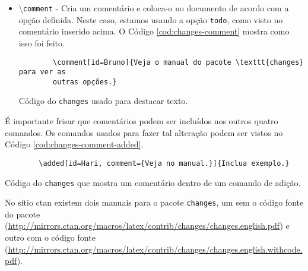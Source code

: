 \begin{itemize}
	\begin{listing}[ht]
		\begin{verbatim}
			\highlight[id=Bruno]{como este aqui.}
		\end{verbatim}
		\caption{Código do \texttt{changes} usado para destacar texto.}
		\label{cod:changes-highlighted}
	\end{listing}

	\item \textbackslash \texttt{comment} - Cria um comentário e coloca-o no documento de acordo com a opção definida. Neste caso, estamos usando a opção \texttt{todo}, como visto no comentário inserido acima. O Código \ref{cod:changes-comment} mostra como isso foi feito.
	
	\begin{listing}[H]
		\begin{verbatim}
		\comment[id=Bruno]{Veja o manual do pacote \texttt{changes} para ver as 
		outras opções.}
		\end{verbatim}
		\caption{Código do \texttt{changes} usado para destacar texto.}
		\label{cod:changes-comment}
	\end{listing}

\end{itemize}

É importante frisar que comentários podem ser incluídos nos outros quatro comandos.  Os comandos usados para fazer tal alteração podem ser vistos no Código \ref{cod:changes-comment-added}.

\begin{listing}[ht]
	\begin{verbatim}
		\added[id=Hari, comment={Veja no manual.}]{Inclua exemplo.}
	\end{verbatim}
	\caption{Código do \texttt{changes} que mostra um comentário dentro de um comando de adição.}
	\label{cod:changes-comment-added}
\end{listing}

No sítio \gls{ctan} existem dois manuais para o pacote \texttt{changes}, um sem o código fonte do pacote (\url{http://mirrors.ctan.org/macros/latex/contrib/changes/changes.english.pdf}) \parencite{changes} e outro com o código fonte (\url{http://mirrors.ctan.org/macros/latex/contrib/changes/changes.english.withcode.pdf}).